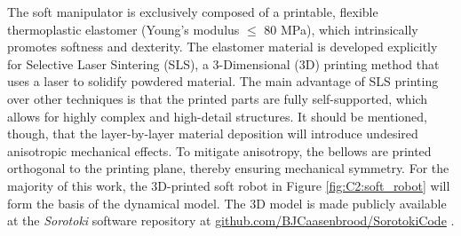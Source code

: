 \begin{rmk} The soft manipulator is exclusively composed of a printable, flexible thermoplastic elastomer (Young's modulus $\le$ 80 \si{\mega \pascal}), which intrinsically promotes softness and dexterity. The elastomer material is developed explicitly for Selective Laser Sintering (SLS), a 3-Dimensional (3D) printing method that uses a laser to solidify powdered material. The main advantage of SLS printing over other techniques is that the printed parts are fully self-supported, which allows for highly complex and high-detail structures. It should be mentioned, though, that the layer-by-layer material deposition will introduce undesired anisotropic mechanical effects. To mitigate anisotropy, the bellows are printed orthogonal to the printing plane, thereby ensuring mechanical symmetry. For the majority of this work, the 3D-printed soft robot in Figure \ref{fig:C2:soft_robot} will form the basis of the dynamical model. The 3D model is made publicly available at the \textit{Sorotoki} software repository at \textnormal{\url{github.com/BJCaasenbrood/SorotokiCode}} \cite{Caasenbrood2020}. 
\end{rmk}

